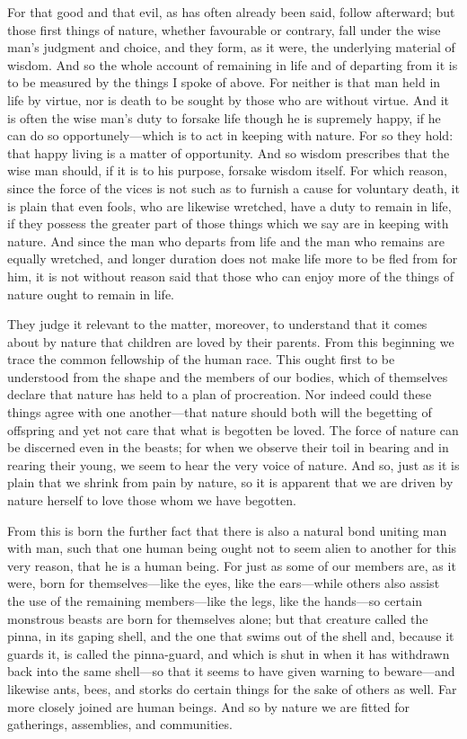  For that good and that evil, as has often already been said, follow afterward; but those first things of nature, whether favourable or contrary, fall under the wise man's judgment and choice, and they form, as it were, the underlying material of wisdom. And so the whole account of remaining in life and of departing from it is to be measured by the things I spoke of above. For neither is that man held in life by virtue, nor is death to be sought by those who are without virtue. And it is often the wise man's duty to forsake life though he is supremely happy, if he can do so opportunely—which is to act in keeping with nature. For so they hold: that happy living is a matter of opportunity. And so wisdom prescribes that the wise man should, if it is to his purpose, forsake wisdom itself. For which reason, since the force of the vices is not such as to furnish a cause for voluntary death, it is plain that even fools, who are likewise wretched, have a duty to remain in life, if they possess the greater part of those things which we say are in keeping with nature. And since the man who departs from life and the man who remains are equally wretched, and longer duration does not make life more to be fled from for him, it is not without reason said that those who can enjoy more of the things of nature ought to remain in life.

 They judge it relevant to the matter, moreover, to understand that it comes about by nature that children are loved by their parents. From this beginning we trace the common fellowship of the human race. This ought first to be understood from the shape and the members of our bodies, which of themselves declare that nature has held to a plan of procreation. Nor indeed could these things agree with one another—that nature should both will the begetting of offspring and yet not care that what is begotten be loved. The force of nature can be discerned even in the beasts; for when we observe their toil in bearing and in rearing their young, we seem to hear the very voice of nature. And so, just as it is plain that we shrink from pain by nature, so it is apparent that we are driven by nature herself to love those whom we have begotten.

 From this is born the further fact that there is also a natural bond uniting man with man, such that one human being ought not to seem alien to another for this very reason, that he is a human being. For just as some of our members are, as it were, born for themselves—like the eyes, like the ears—while others also assist the use of the remaining members—like the legs, like the hands—so certain monstrous beasts are born for themselves alone; but that creature called the pinna, in its gaping shell, and the one that swims out of the shell and, because it guards it, is called the pinna-guard, and which is shut in when it has withdrawn back into the same shell—so that it seems to have given warning to beware—and likewise ants, bees, and storks do certain things for the sake of others as well. Far more closely joined are human beings. And so by nature we are fitted for gatherings, assemblies, and communities.

